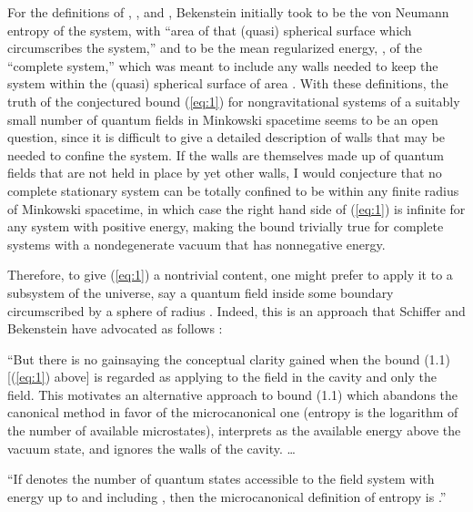 \documentclass[a4paper,12pt]{article}
\begin{document}
	For the definitions of \coordHE{}, \coordHE{}, and \coordHE{},
Bekenstein initially
\cite{Bek1,Bek2}
took \coordHE{} to be the von Neumann
entropy \coordHE{} of the system,
\coordHE{} with
``area \coordHE{} of that (quasi) spherical surface
which circumscribes the system,''
and \coordHE{} to be the mean regularized energy, \coordHE{},
of the ``complete system,'' which was meant to include
any walls needed to keep the system within the
(quasi) spherical surface of area \coordHE{}.
With these definitions, the truth of the conjectured
bound (\ref{eq:1}) for nongravitational systems
of a suitably small number of quantum fields
in Minkowski spacetime seems to be an open question,
since it is difficult to give a detailed description
of walls that may be needed to confine the system.
If the walls are themselves made up of quantum fields
that are not held in place by yet other walls,
I would conjecture that no complete stationary system can
be totally confined to be within any finite radius \coordHE{}
of Minkowski spacetime,
in which case the right hand side of (\ref{eq:1})
is infinite for any system with positive energy,
making the bound trivially true for complete systems
with a nondegenerate vacuum that has nonnegative energy.

	Therefore, to give (\ref{eq:1}) a nontrivial
content, one might prefer to apply it to a subsystem
of the universe, say a quantum field inside some
boundary circumscribed by a sphere of radius \coordHE{}.
Indeed, this is an approach that Schiffer and Bekenstein
have advocated as follows
\cite{SB1}:

	``But there is no gainsaying the conceptual clarity
gained when the bound (1.1) [(\ref{eq:1}) above]
is regarded as applying to the field in the cavity
and only the field.  This motivates an alternative
approach to bound (1.1) which abandons the canonical
method in favor of the microcanonical one
(entropy is the logarithm of the number of available
microstates), interprets \coordHE{} as the available energy
above the vacuum state, and ignores the walls of the cavity. \ldots

	``If \coordHE{} denotes the number of quantum states
accessible to the field system with energy up to and including
\coordHE{}, then the microcanonical definition of entropy is
\coordHE{}.''
\end{document}
